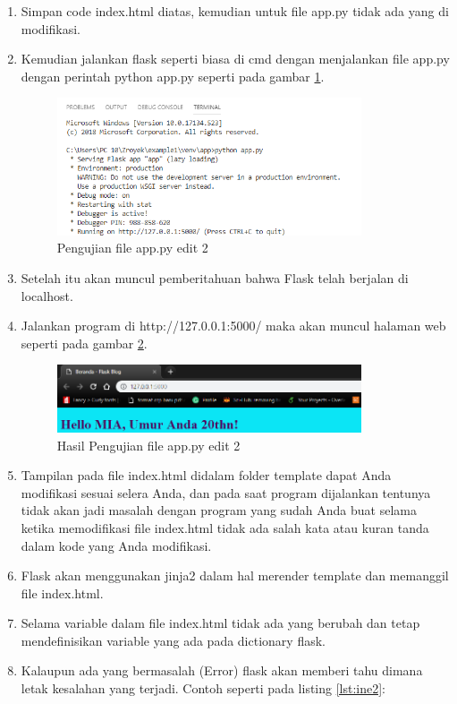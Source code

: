 \begin{enumerate}
\item Simpan code index.html diatas, kemudian untuk file app.py tidak ada yang di modifikasi.
\item Kemudian jalankan flask seperti biasa di cmd dengan menjalankan file app.py dengan perintah python app.py seperti pada gambar \ref{fig:ufa2}.
\begin{figure}[!htbp]
	\centerline{\includegraphics[width=0.85\textwidth]{figures/13/ufa2.PNG}}
	\caption{Pengujian file app.py edit 2}
	\label{fig:ufa2}
\end{figure}

\item Setelah itu akan muncul pemberitahuan bahwa Flask telah berjalan di localhost.
\item Jalankan program di http://127.0.0.1:5000/ maka akan muncul halaman web seperti pada gambar \ref{fig:hufae2}.
\begin{figure}[!htbp]
	\centerline{\includegraphics[width=0.85\textwidth]{figures/13/hufae2.PNG}}
	\caption{Hasil Pengujian file app.py edit 2}
	\label{fig:hufae2}
\end{figure}

\item Tampilan pada file index.html didalam folder template dapat  Anda modifikasi sesuai selera  Anda, dan pada saat program dijalankan tentunya tidak akan jadi masalah dengan program yang sudah  Anda buat selama ketika memodifikasi file index.html tidak ada salah kata atau kuran tanda dalam kode yang  Anda modifikasi.
\item Flask akan menggunakan jinja2 dalam hal merender template dan memanggil file index.html.
\item Selama variable dalam file index.html tidak ada yang berubah dan tetap mendefinisikan variable yang ada pada dictionary flask.
\item Kalaupun ada yang bermasalah (Error) flask akan memberi tahu dimana letak kesalahan yang terjadi.
Contoh seperti pada listing \ref{lst:ine2}:



\end{enumerate}
